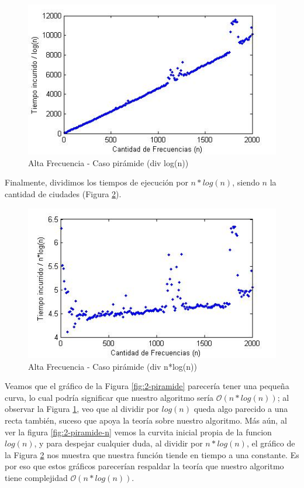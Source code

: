 \begin{figure}[htb]
	\begin{center}
    		\includegraphics[scale=0.5]{imagenes/2-tren-div-logn.jpg}
	\end{center}
	\caption{Alta Frecuencia - Caso pirámide (div log(n))}\label{fig:2-piramide-logn}
\end{figure}

Finalmente, dividimos los tiempos de ejecución por $n*log(n)$, siendo $n$ la cantidad de ciudades (Figura \ref{fig:2-piramide-nlogn}).

\begin{figure}[htb]
	\begin{center}
    		\includegraphics[scale=0.5]{imagenes/2-tren-div-nlogn.jpg}
	\end{center}
	\caption{Alta Frecuencia - Caso pirámide (div n*log(n))}\label{fig:2-piramide-nlogn}
\end{figure}

Veamos que el gráfico de la Figura \ref{fig:2-piramide} parecería tener una pequeña curva, lo cual podría significar que nuestro algoritmo sería $\mathcal{O}(n*log(n))$; al observar la Figura \ref{fig:2-piramide-logn}, veo que al dividir por $log(n)$ queda algo parecido a una recta también, suceso que apoya la teoría sobre nuestro algoritmo. Más aún, al ver la figura \ref{fig:2-piramide-n} vemos la curvita inicial propia de la funcion $log(n)$, y para despejar cualquier duda, al dividir por $n*log(n)$, el gráfico de la Figura \ref{fig:2-piramide-nlogn} nos muestra que nuestra función tiende en tiempo a una constante. Es por eso que estos gráficos parecerían respaldar la teoría que nuestro algoritmo tiene complejidad $\mathcal{O}(n*log(n))$.
